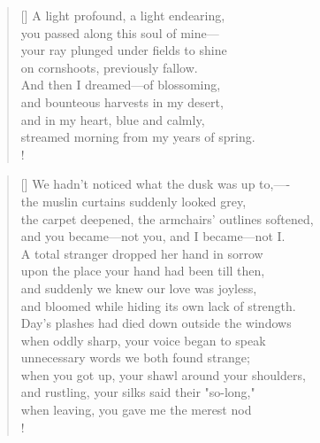 \documentclass[]{article}
\begin{document}
\settowidth{\versewidth}{A light profound, a light endearing,}
\begin{verse}[\versewidth]
A light profound, a light endearing,\\
you passed along this soul of mine—\\
your ray plunged under fields to shine\\
on cornshoots, previously fallow.\\
And then I dreamed—of blossoming,\\
and bounteous harvests in my desert,\\
and in my heart, blue and calmly,\\
streamed morning from my years of spring.\\!
\end{verse}
\newpage 

\vspace*{0.03\textheight}
\settowidth{\versewidth}{ We hadn't noticed what the dusk was up to,}
\begin{verse}[\versewidth]
We hadn't noticed what the dusk was up to,—- \\
the muslin curtains suddenly looked grey,\\
the carpet deepened, the armchairs' outlines softened,\\
and you became—not you, and I became—not I.\\
A total stranger dropped her hand in sorrow\\
upon the place your hand had been till then,\\
and suddenly we knew our love was joyless,\\
and bloomed while hiding its own lack of strength.\\
Day's plashes had died down outside the windows\\
when oddly sharp, your voice began to speak\\
unnecessary words we both found strange;\\
when you got up, your shawl around your shoulders,\\
and rustling, your silks said their "so-long,"\\
when leaving, you gave me the merest nod\\!
\end{verse}
\bigskip \bigskip
\end{document}

